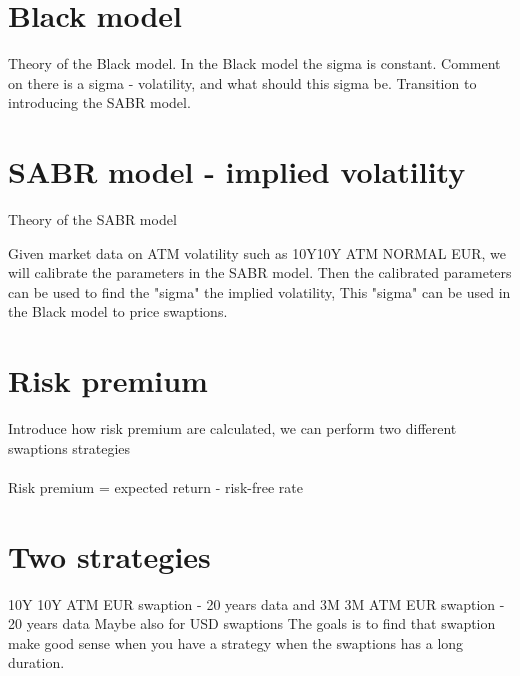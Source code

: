 \documentclass{article}
\begin{document}
\section{Black model}
Theory of the Black model. 
In the Black model the sigma is constant. 
Comment on there is a sigma - volatility, and what should this sigma be. Transition to introducing the SABR model.

\section{SABR model - implied volatility}
Theory of the SABR model 

Given market data on ATM volatility such as 10Y10Y ATM NORMAL EUR, we will calibrate the parameters in the SABR model. 
Then the calibrated parameters can be used to find the "sigma" the implied volatility, 
This "sigma" can be used in the Black model to price swaptions. 

\section{Risk premium}
Introduce how risk premium are calculated, we can perform two different swaptions strategies 
\\\\
Risk premium = expected return - risk-free rate 

\section{Two strategies}

10Y 10Y ATM EUR swaption - 20 years data and 3M 3M ATM EUR swaption - 20 years data 
\medskip
Maybe also for USD swaptions
\medskip
The goals is to find that swaption make good sense when you have a strategy when the swaptions has a long duration. 
\end{document}
